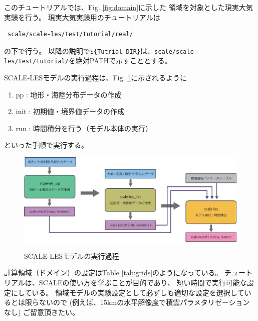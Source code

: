 
このチュートリアルでは、Fig. \ref{fig:domain}に示した
領域を対象とした現実大気実験を行う。
現実大気実験用のチュートリアルは
\begin{verbatim}
 scale/scale-les/test/tutorial/real/
\end{verbatim}
の下で行う。
以降の説明で\verb|${Tutrial_DIR}|は、\verb|scale/scale-les/test/tutorial/|を絶対PATHで示すこととする。

SCALE-LESモデルの実行過程は、Fig. \ref{fig:howto}に示されるように
\begin{enumerate}
\item pp : 地形・海陸分布データの作成
\item init : 初期値・境界値データの作成
\item run : 時間積分を行う（モデル本体の実行）
\end{enumerate}
といった手順で実行する。


\begin{figure}[h]
\begin{center}
  \includegraphics[width=0.9\hsize]{./figure/how_to_run.eps}\\
  \caption{SCALE-LESモデルの実行過程}
  \label{fig:howto}
\end{center}
\end{figure}

計算領域（ドメイン）の設定はTable \ref{tab:grids}のようになっている。
チュートリアルは、SCALEの使い方を学ぶことが目的であり、
短い時間で実行可能な設定にしている。
領域モデルの実験設定として必ずしも適切な設定を選択しているとは限らないので
(例えば、15kmの水平解像度で積雲パラメタリゼーションなし)
ご留意頂きたい。

